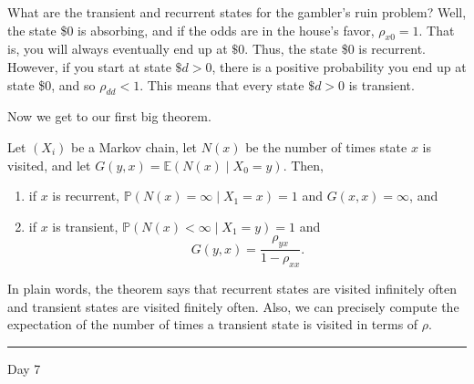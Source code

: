 \documentclass{problemset}
\newcommand{\E}{\mathbb{E}}
\newcommand{\1}{\mathbf{1}}
\renewcommand{\P}{\mathbb{P}}
\newcommand{\fatrule}[1]{\vspace{.3cm}\hrule {\hfill \sf #1}\par}
\begin{document}
	What are the transient and recurrent states for the gambler's ruin problem?  Well, the
	state \$0 is absorbing, and if the odds are in the house's favor, $\rho_{x0}=1$.  That
	is, you will always eventually end up at $\$0$.  Thus, the state \$0 is recurrent.  However,
	if you start at state $\$d>0$, there is a positive probability you end up at
	state \$0, and so $\rho_{dd}<1$.  This means that every state $\$d>0$ is transient.

	Now we get to our first big theorem.

	\begin{theorem}
		Let $(X_i)$ be a Markov chain, let $N(x)$ be the number of times state
		$x$ is visited, and let $G(y,x)=\E(N(x)\mid X_0=y)$. Then,
		\begin{enumerate}[label=(i)]
			\item if $x$ is recurrent, $\P(N(x) = \infty\mid X_1= x)=1$ and $G(x,x)=\infty$, and
			\item if $x$ is transient, $\P(N(x) < \infty\mid X_1=y)=1$ and
				\[
					G(y,x) = \frac{\rho_{yx}}{1-\rho_{xx}}.
				\]
		\end{enumerate}
	\end{theorem}
	In plain words, the theorem says that recurrent states are visited infinitely
	often and transient states are visited finitely often.  Also, we can precisely
	compute the expectation of the number of times a transient state is visited
	in terms of $\rho$.

	\fatrule{Day 7}
\end{document}
